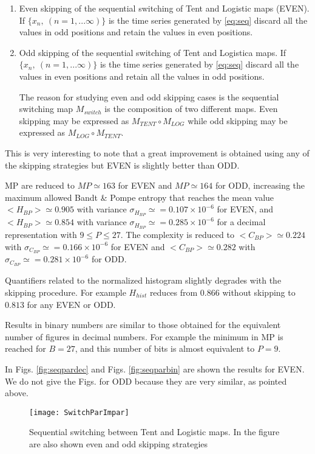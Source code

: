 \begin{enumerate}
\begin{enumerate}
\item Even skipping of the sequential switching of Tent and Logistic maps (EVEN).\\
If $\{x_n,~(n=1,...\infty)\}$ is the time series generated by \ref{eq:seq} discard all the values in odd positions and retain the values in even positions.
\item Odd skipping of the sequential switching of Tent and Logistica maps.
If $\{x_n,~(n=1,...\infty)\}$ is the time series generated by \ref{eq:seq} discard all the values in even positions and retain all the values in odd positions.

The reason for studying even and odd skipping cases is the sequential switching map $M_{switch}$ is the composition of two different maps. Even skipping may be expressed as $M_{TENT}\circ M_{LOG}$ while odd skipping may be expressed as $M_{LOG}\circ M_{TENT}$.
\end{enumerate}
This is very interesting to note that a great improvement is obtained using any of the skipping strategies but EVEN is slightly better than ODD.  

MP are reduced to $MP\simeq 163$ for EVEN and $MP\simeq 164$ for ODD, increasing the maximum allowed Bandt \& Pompe entropy that reaches the mean value $<H_{BP}>\simeq 0.905$ with variance $\sigma_{H_{BP}}\simeq=0.107 \times 10^{-6}$ for EVEN, and $<H_{BP}>\simeq 0.854$ with variance $\sigma_{H_{BP}}\simeq=0.285 \times 10^{-6}$ for a decimal representation with  $9\leq P\leq27$. The complexity is reduced to $<C_{BP}>\simeq 0.224$ with $\sigma_{C_{BP}}\simeq=0.166 \times 10^{-6}$ for EVEN and  $<C_{BP}>\simeq 0.282$ with $\sigma_{C_{BP}}\simeq=0.281 \times 10^{-6}$ for ODD.

Quantifiers related to the normalized histogram slightly degrades with the skipping procedure. For example $H_{hist}$ reduces from $0.866$ without skipping to $0.813$ for any EVEN or ODD. 

Results in binary numbers are similar to those obtained for the equivalent number of figures in decimal numbers. For example the minimum in MP is reached for $B=27$, and this number of bits is almost equivalent to $P=9$. 
\end{enumerate}
In Figs. \ref{fig:seqpardec} and Figs. \ref{fig:seqparbin} are shown the results for EVEN. We do not give the Figs. for ODD because they are very similar, as pointed above. 
%

% 

\begin{figure}
	\texttt{[image: SwitchParImpar]}
	\caption{Sequential switching between Tent and Logistic maps. In the figure are also shown even and odd skipping strategies} \label{fig:seq}
\end{figure}

